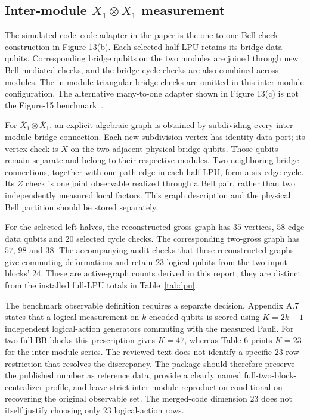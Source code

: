 \documentclass[11pt,a4paper]{article}
\newcommand{\lx}{\overline{X}}
\begin{document}
\subsection{Inter-module \texorpdfstring{$\lx_1\otimes\lx_1$}{X1 x X1} measurement}

The simulated code--code adapter in the paper is the one-to-one Bell-check construction in Figure 13(b). Each selected half-LPU retains its bridge data qubits. Corresponding bridge qubits on the two modules are joined through new Bell-mediated checks, and the bridge-cycle checks are also combined across modules. The in-module triangular bridge checks are omitted in this inter-module configuration. The alternative many-to-one adapter shown in Figure 13(c) is not the Figure-15 benchmark~\cite{tdg}.

For $\lx_1\otimes\lx_1$, an explicit algebraic graph is obtained by subdividing every inter-module bridge connection. Each new subdivision vertex has identity data port; its vertex check is $X$ on the two adjacent physical bridge qubits. Those qubits remain separate and belong to their respective modules. Two neighboring bridge connections, together with one path edge in each half-LPU, form a six-edge cycle. Its $Z$ check is one joint observable realized through a Bell pair, rather than two independently measured local factors. This graph description and the physical Bell partition should be stored separately.

For the selected left halves, the reconstructed gross graph has $35$ vertices, $58$ edge data qubits and $20$ selected cycle checks. The corresponding two-gross graph has $57$, $98$ and $38$. The accompanying audit checks that these reconstructed graphs give commuting deformations and retain $23$ logical qubits from the two input blocks' $24$. These are active-graph counts derived in this report; they are distinct from the installed full-LPU totals in Table~\ref{tab:lpu}.

The benchmark observable definition requires a separate decision. Appendix A.7 states that a logical measurement on $k$ encoded qubits is scored using $K=2k-1$ independent logical-action generators commuting with the measured Pauli. For two full BB blocks this prescription gives $K=47$, whereas Table 6 prints $K=23$ for the inter-module series. The reviewed text does not identify a specific 23-row restriction that resolves the discrepancy. The package should therefore preserve the published number as reference data, provide a clearly named full-two-block-centralizer profile, and leave strict inter-module reproduction conditional on recovering the original observable set. The merged-code dimension $23$ does not itself justify choosing only $23$ logical-action rows.
\end{document}
